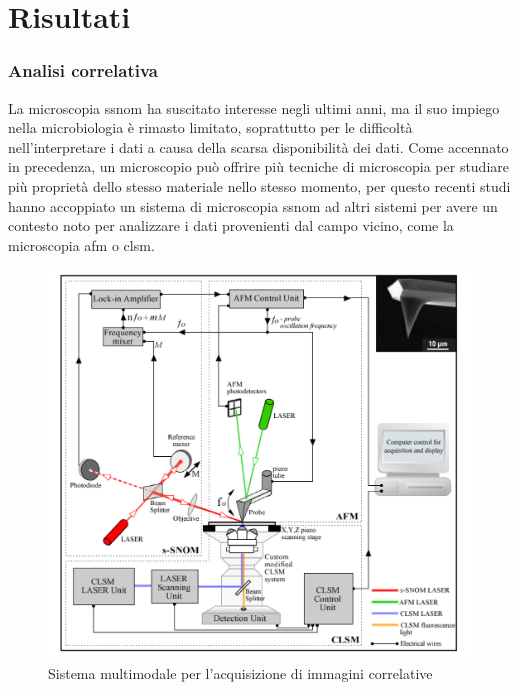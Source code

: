 ﻿\documentclass[../main.tex]{subfiles}
\begin{document}
\chapter{Risultati}

\subsection{Analisi correlativa}
La microscopia \acrshort{ssnom} ha suscitato interesse negli ultimi anni, ma il suo impiego nella \gls{microbiologia} è rimasto limitato, soprattutto per le difficoltà nell'interpretare i dati a causa della scarsa disponibilità dei dati. Come accennato in precedenza, un microscopio può offrire più tecniche di microscopia per studiare più proprietà dello stesso materiale nello stesso momento, per questo recenti studi hanno accoppiato un sistema di microscopia \acrshort{ssnom} ad altri sistemi per avere un contesto noto per analizzare i dati provenienti dal campo vicino, come la microscopia \acrfull{afm} o \acrshort{clsm}.\cite{stanciu_2017}

\begin{figure}[h]
\centering
\includegraphics[keepaspectratio, height=\linewidth]{images/multimodal_system.jpg}
\caption[Sistema multimodale per l'acquisizione di immagini correlative]{
	Sistema multimodale per l'acquisizione di immagini correlative \cite{stanciu_2017}}
\label{fig:multimodal_system}
\end{figure}
\end{document}
